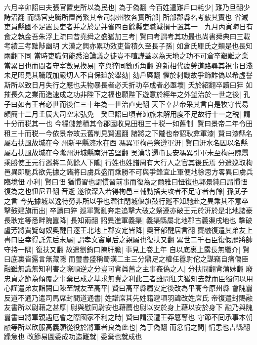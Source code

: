 六月辛卯詔曰夫張官置吏所以為民也|{
	為于偽翻}
今百姓遭難戶口耗少|{
	難乃旦翻少詩沼翻}
而縣官吏職所置尚繁其令司隸州牧各實所部|{
	所部郡縣名考覈其實也}
省減吏員縣國不足置長吏者并之於是并省四百餘縣吏職減損十置其一　九月丙寅晦日有食之執金吾朱浮上疏曰昔堯舜之盛猶加三考|{
	賢曰考謂考其功最也尚書舜典曰三載考績三考黜陟幽明}
大漢之興亦累功效吏皆積久至長子孫|{
	如倉氏庫氏之類是也長知兩翻下同}
當時吏職何能悉治論議之徒豈不喧譁蓋以為天地之功不可倉卒艱難之業當累日也而間者守宰數見換易|{
	卒與猝同數所角翻}
迎新相代疲勞道路尋其視事日淺未足昭見其職旣加嚴切人不自保廹於舉劾|{
	劾戶槩翻}
懼於刺譏故爭飾詐偽以希虚譽斯所以致日月失行之應也夫物暴長者必夭折功卒成者必亟壞|{
	夭於紹翻卒讀曰猝}
如摧長久之業而造速成之功非陛下之福也願陛下遊意於經年之外望治於一世之後|{
	孔子曰如有王者必世而後仁三十年為一世治直吏翻}
天下幸甚帝采其言自是牧守代易頗簡十二月壬辰大司空宋弘免　癸巳詔曰頃者師旅未解用度不足故行十一之税|{
	謂十分而税其一也}
今糧儲差積其令郡國收見田租三十税一如舊制|{
	賢曰景帝二年令田租三十而税一今依景帝故云舊制見賢遍翻}
諸將之下隴也帝詔耿弇軍漆|{
	賢曰漆縣名屬右扶風故城在今州新平縣漆水在西}
馮異軍栒邑祭遵軍汧|{
	賢曰汧水名因以名縣屬右扶風故城在今隴州汧城縣南汧苦堅翻}
吳漢等還屯長安馮異引軍未至栒邑隗囂乘勝使王元行廵將二萬餘人下隴|{
	行姓也姓譜周有大行人之官其後氏焉}
分遣廵取栒邑異即馳兵欲先據之諸將曰虜兵盛而乘勝不可與爭鋒宜止軍便地徐思方畧異曰虜兵臨境忸小利|{
	賢曰忸猶慣習也謂慣習前事而復為之爾雅曰忸復也郭景純曰謂慣忸復為之也忸尼丑翻音逝}
遂欲深入若得栒邑三輔動搖夫攻者不足守者有餘|{
	孫武子之言}
今先據城以逸待勞非所以爭也濳往閉城偃旗鼔行廵不知馳赴之異乘其不意卒擊鼓建旗而出|{
	卒讀曰猝}
廵軍驚亂奔走追擊大破之祭遵亦破王元於汧於是北地諸豪長耿定等悉畔隗囂降|{
	長知兩翻}
詔異進軍義渠|{
	義渠縣屬北地郡古義渠戌地也}
擊破盧芳將賈覽匈奴奥鞬日逐王北地上郡安定皆降|{
	奧音郁鞬居言翻}
竇融復遣其弟友上書曰臣幸得託先后末屬|{
	謂孝文竇皇后之親屬也復扶又翻}
累世二千石臣復假歷將帥守持一隅|{
	復扶又翻}
故遣劉鈞口陳肝膽|{
	事見上卷上年}
自以底裏上露長無纖介|{
	賢曰底裏皆露言無藏隱}
而璽書盛稱蜀漢二主三分鼎足之權任囂尉佗之謀竊自痛傷臣融雖無識無知利害之際順逆之分豈可背眞舊之主事姦偽之人|{
	分扶問翻背蒲妹翻}
廢忠貞之節為傾覆之事棄已成之基求無冀之利此三者雖問狂夫猶知去就而臣獨何以用心謹遣弟友詣闕口陳至誠友至高平|{
	賢曰高平縣屬安定後改為平高今原州縣}
會隗囂反道不通乃遣司馬席封間道通書|{
	姓譜席其先姓籍避項羽諱改姓席氏}
帝復遣封賜融友書所以尉藉之甚厚|{
	尉與慰同尉安也藉薦也尉以安於身上藉以安於身下}
融乃與隗囂書曰將軍親遇厄會之際國家不利之時|{
	賢曰謂漢遭王莽簒奪也}
守節不囘承事本朝融等所以欣服高義願從役於將軍者良為此也|{
	為于偽翻}
而忿悁之間|{
	悁恚也吉縣翻躁急也}
改節易圖委成功造難就|{
	委棄也就成也}

